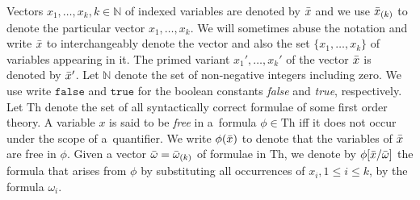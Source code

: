 \documentclass[10pt]{llncs}
\newcommand{\nat}{{\mathbb N}}
\newcommand{\true}{\mathtt{true}}
\newcommand{\false}{\mathtt{false}}
\newcommand{\tuple}[1]{\left\langle #1 \right\rangle}
\newcommand{\theo}{\mbox{Th}}
\newcommand{\set}{\vect}
\newcommand{\subst}[3]{#1[#2/#3]}
\begin{document}
Vectors $x_1,\ldots,x_k,k\in\nat$ of indexed variables are denoted by $\vect{x}$ and we use $\vect{x}[k]$ to denote the particular vector $x_1,\ldots,x_k$.
%
We will sometimes abuse the notation and write $\vect{x}$ to interchangeably denote 
the vector and also the set $\{x_1,\ldots,x_k\}$ of variables appearing in it.
%
The primed variant $x_1',\ldots,x_k'$ of the vector $\vect{x}$ is denoted by $\vect{x}'$.
%
Let $\nat$ denote the set of non-negative integers including zero. 
%
We use write $\false$ and $\true$ for the
boolean constants \emph{false} and \emph{true}, respectively. 
%
Let $\theo$ denote the set of all syntactically correct formulae of some first order theory. 
%
%
A variable $x$
is said to be \emph{free} in a~formula $\phi\in\theo$
iff it does not occur under the scope of a~quantifier.
We write $\phi(\vect{x})$ to denote that the variables of $\vect{x}$ are free in $\phi$.
%
Given a vector $\vect \omega = \vect \omega[k]$ of formulae in $\theo$, 
we denote by $\subst{\phi}{\vect x}{\vect \omega}$ the formula that arises from $\phi$ by substituting all occurrences of $x_i,1\leq i \leq k$, by the formula $\omega_i$.  
%
%
%
%
%
%
%
%
\end{document}
